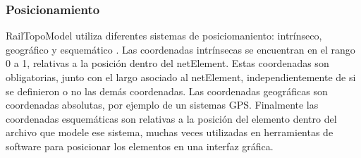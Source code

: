 \subsubsection{Posicionamiento}

    RailTopoModel utiliza diferentes sistemas de posiciomaniento: intrínseco, geográfico y esquemático \cite{Paper_112,Paper_150}. Las coordenadas intrínsecas se encuentran en el rango 0 a 1, relativas a la posición dentro del netElement. Estas coordenadas son obligatorias, junto con el largo asociado al netElement, independientemente de si se definieron o no las demás coordenadas. Las coordenadas geográficas son coordenadas absolutas, por ejemplo de un sistemas GPS. Finalmente las coordenadas esquemáticas son relativas a la posición del elemento dentro del archivo que modele ese sistema, muchas veces utilizadas en herramientas de software para posicionar los elementos en una interfaz gráfica.
